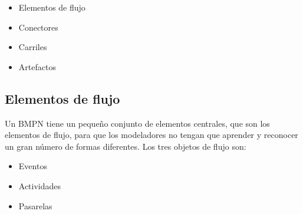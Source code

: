 \begin{itemize}
    \item Elementos de flujo
    \item Conectores
    \item Carriles
    \item Artefactos
\end{itemize}

\subsection{Elementos de flujo}

Un BMPN tiene un pequeño conjunto de  elementos centrales, que son los elementos de flujo, para que los modeladores no tengan que aprender y reconocer un gran número de formas diferentes.
Los tres objetos de flujo son:

\begin{itemize}
    \item Eventos
    \item Actividades
    \item Pasarelas
\end{itemize}

